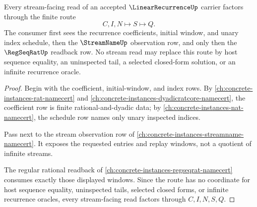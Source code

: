 \begin{theorem}
\label{thm:linear-recurrence-stream-handoff}
Every stream-facing read of an accepted $\LinearRecurrenceUp$ carrier factors through the finite route
$$
C,I,N \longmapsto S \longmapsto Q .
$$
The consumer first sees the recurrence coefficients, initial window, and unary index schedule, then the $\StreamNameUp$ observation row, and only then the $\RegSeqRatUp$ readback row. No stream read may replace this route by host sequence equality, an uninspected tail, a selected closed-form solution, or an infinite recurrence oracle.
\end{theorem}
\begin{proof}
Begin with the coefficient, initial-window, and index rows. By \autoref{ch:concrete-instances-rat-namecert} and \autoref{ch:concrete-instances-dyadicratcore-namecert}, the coefficient row is finite rational-and-dyadic data; by \autoref{ch:concrete-instances-nat-namecert}, the schedule row names only unary inspected indices.

Pass next to the stream observation row of \autoref{ch:concrete-instances-streamname-namecert}. It exposes the requested entries and replay windows, not a quotient of infinite streams.

The regular rational readback of \autoref{ch:concrete-instances-regseqrat-namecert} consumes exactly those displayed windows. Since the route has no coordinate for host sequence equality, uninspected tails, selected closed forms, or infinite recurrence oracles, every stream-facing read factors through $C,I,N,S,Q$.
\end{proof}

